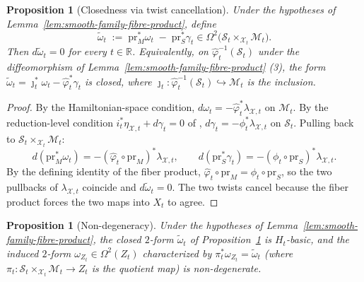 \documentclass[reqno]{amsart}
\theoremstyle{plain}
\newtheorem{Prop}[Thm]{Proposition}
\theoremstyle{definition}
\newcommand{\R}{\mathbb{R}}
\renewcommand{\S}{\mathcal{S}}
\newcommand{\M}{\mathcal{M}}
\newcommand{\X}{\mathcal{X}}
\begin{document}
\begin{Prop}[Closedness via twist cancellation]\label{prop:closedness}
Under the hypotheses of Lemma~\ref{lem:smooth-family-fibre-product},
define
\begin{equation}\label{eq:reduced-form-upstairs}
   \widetilde\omega_t
   \;:=\;
   \mathrm{pr}_M^{*} \omega_t \;-\; \mathrm{pr}_S^{*} \gamma_t
\in \Omega^2\bigl(\S_t \times_{\X_t} \M_t\bigr).
\end{equation}
Then $d\widetilde\omega_t = 0$ for every $t \in \R$. Equivalently,
on $\hat\varphi_t^{-1}(\S_t)$ under the diffeomorphism of
Lemma~\ref{lem:smooth-family-fibre-product} (3), the form
$\widetilde\omega_t = \jmath_t^{*}\omega_t - \hat\varphi_t^{*}\gamma_t$
is closed, where $\jmath_t \colon \hat\varphi_t^{-1}(\S_t) \hookrightarrow \M_t$
is the inclusion.
\end{Prop}
 
\begin{proof}
By the Hamiltonian-space condition,
$d\omega_t = -\hat\varphi_t^{*} \lambda_{\mathcal{X},t}$ on $\M_t$. By the reduction-level condition $i_t^{*}\eta_{\mathcal{X},t} + d\gamma_t = 0$
of \cite[Definition 2.1]{bualibanu2026reduction},
$d\gamma_t = -\phi_t^{*}\lambda_{\mathcal{X},t}$ on $\S_t$. Pulling back to
$\S_t \times_{\X_t} \M_t$:
\[
   d(\mathrm{pr}_M^{*}\omega_t)
   = -(\hat\varphi_t \circ \mathrm{pr}_M)^{*} \lambda_{\mathcal{X},t},
   \qquad
   d(\mathrm{pr}_S^{*}\gamma_t)
   = -(\phi_t \circ \mathrm{pr}_S)^{*} \lambda_{\mathcal{X},t}.
\]
By the defining identity of the fiber product,
$\hat\varphi_t \circ \mathrm{pr}_M = \phi_t \circ \mathrm{pr}_S$, so the
two pullbacks of $\lambda_{\mathcal{X},t}$ coincide and
$d\widetilde\omega_t = 0$. The two twists cancel because the fiber
product forces the two maps into $X_t$ to agree.
\end{proof}

\begin{Prop}[Non-degeneracy]\label{prop:nondegeneracy}
Under the hypotheses of Lemma~\ref{lem:smooth-family-fibre-product},
the closed $2$-form $\widetilde\omega_t$ of
Proposition~\ref{prop:closedness} is $H_t$-basic, and the induced
$2$-form $\omega_{Z_t} \in \Omega^2(Z_t)$ characterized by
$\pi_t^{*}\omega_{Z_t} = \widetilde\omega_t$
(where $\pi_t \colon \S_t \times_{\X_t} \M_t \to Z_t$ is the quotient map)
is non-degenerate.
\end{Prop}
 
\end{document}
